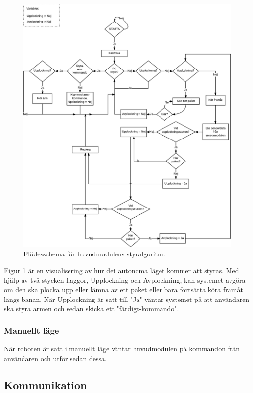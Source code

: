 \begin{figure}[h]
\center
\includegraphics[scale=0.2]{Styrlogik.png}
\caption{Flödesschema för huvudmodulens styralgoritm.} \label{systemskiss:autonomtschema}
\end{figure}

Figur \ref{systemskiss:autonomtschema} är en visualisering av hur det autonoma läget kommer att styras. Med hjälp av två stycken flaggor, Upplockning och Avplockning, kan systemet avgöra om den ska plocka upp eller lämna av ett paket eller bara fortsätta köra framåt längs banan. När Upplockning är satt till "Ja" väntar systemet på att användaren ska styra armen och sedan skicka ett "färdigt-kommando".

\subsubsection{Manuellt läge}
När roboten är satt i manuellt läge väntar huvudmodulen på kommandon från användaren och utför sedan dessa. 


\subsection{Kommunikation}
